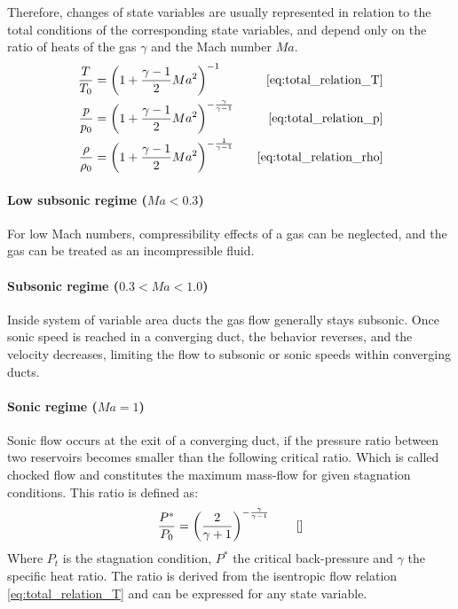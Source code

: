	Therefore, changes of state variables are usually represented in relation to the total conditions of the corresponding state variables, and depend only on the ratio of heats of the gas $\gamma$ and the Mach number $Ma$.
	\begin{alignat*}{2}
	    \frac{T}{T_0}   & = \left( 1 + \frac{\gamma - 1}{2} Ma^2 \right)^{-1} \qquad &\eqref{eq:total_relation_T}\\
	    \frac{p}{p_0}   & = \left( 1 + \frac{\gamma - 1}{2} Ma^2 \right)^{-\frac{\gamma}{\gamma - 1}} &\eqref{eq:total_relation_p}\\
	    \frac{\rho}{\rho_0} & = \left( 1 + \frac{\gamma - 1}{2} Ma^2 \right)^{-\frac{1}{\gamma - 1}} &\eqref{eq:total_relation_rho}
	\end{alignat*}

	\paragraph{Low subsonic regime (\(Ma < 0.3\))}
		For low Mach numbers, compressibility effects of a gas can be neglected, and the gas can be treated as an incompressible fluid.

	\paragraph{Subsonic regime (\(0.3 < Ma < 1.0\))} 
		Inside system of variable area ducts the gas flow generally stays subsonic.
		Once sonic speed is reached in a converging duct, the behavior reverses, and the velocity decreases, limiting the flow to subsonic or sonic speeds within converging ducts.\\
		

	\paragraph{Sonic regime (\(Ma = 1\))}
		Sonic flow occurs at the exit of a converging duct, if the pressure ratio between two reservoirs becomes smaller than the following critical ratio.
		Which is called chocked flow and constitutes the maximum mass-flow for given stagnation conditions. 
		This ratio is defined as:
		$$
			\frac{P^*}{P_0}=\left(\frac{2}{\gamma + 1}\right)^{-\frac{\gamma}{\gamma - 1}} \qquad \eqref{}
		$$ 
		Where $P_t$ is the stagnation condition, $P^*$ the critical back-pressure and $\gamma$ the specific heat ratio.
		The ratio is derived from the isentropic flow relation \eqref{eq:total_relation_T} and can be expressed for any state variable.

